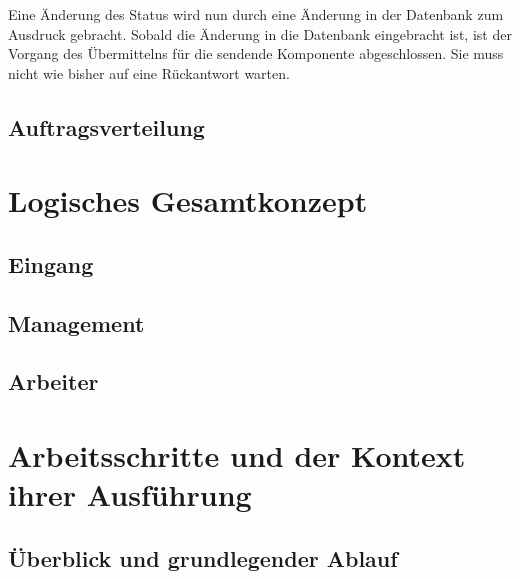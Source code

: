 Eine Änderung des Status wird nun durch eine Änderung in der Datenbank zum Ausdruck gebracht.
Sobald die Änderung in die Datenbank eingebracht ist,
ist der Vorgang des Übermittelns für die sendende Komponente abgeschlossen.
Sie muss nicht wie bisher auf eine Rückantwort warten.

\subsection{Auftragsverteilung}

\section{Logisches Gesamtkonzept}
\subsection{Eingang}
\subsection{Management}
\subsection{Arbeiter}

\section{Arbeitsschritte und der Kontext ihrer Ausführung}

\subsection{Überblick und grundlegender Ablauf}

